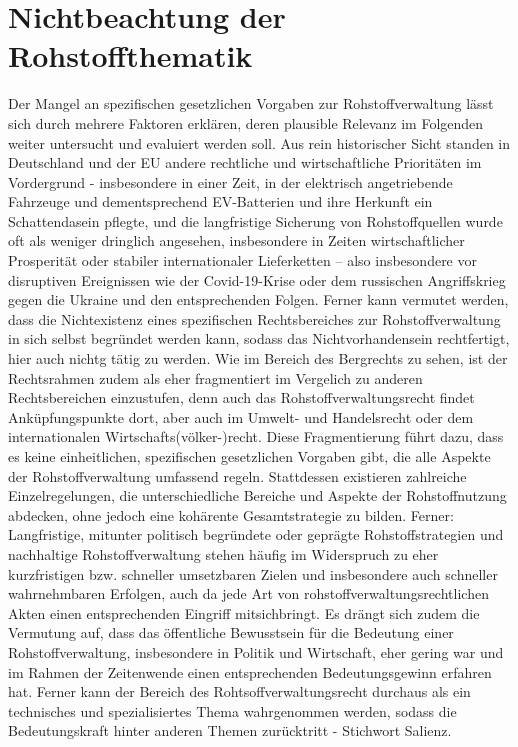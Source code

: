 \documentclass[12pt,a4paper,oneside]{book} %
\begin{document}
{	\section{Nichtbeachtung der Rohstoffthematik}
	Der Mangel an spezifischen gesetzlichen Vorgaben zur Rohstoffverwaltung lässt sich durch mehrere Faktoren erklären, deren plausible Relevanz im Folgenden weiter untersucht und evaluiert werden soll. Aus rein historischer Sicht standen in Deutschland und der EU andere rechtliche und wirtschaftliche Prioritäten im Vordergrund - insbesondere in einer Zeit, in der elektrisch angetriebende Fahrzeuge und dementsprechend EV-Batterien und ihre Herkunft ein Schattendasein pflegte, und die langfristige Sicherung von Rohstoffquellen wurde oft als weniger dringlich angesehen, insbesondere in Zeiten wirtschaftlicher Prosperität oder stabiler internationaler Lieferketten – also insbesondere vor disruptiven Ereignissen wie der Covid-19-Krise oder dem russischen Angriffskrieg gegen die Ukraine und den entsprechenden Folgen.
	Ferner kann vermutet werden, dass die Nichtexistenz eines spezifischen Rechtsbereiches zur Rohstoffverwaltung in sich selbst begründet werden kann, sodass das Nichtvorhandensein rechtfertigt, hier auch nichtg tätig zu werden. Wie im Bereich des Bergrechts zu sehen, ist der Rechtsrahmen zudem als eher fragmentiert im Vergelich zu anderen Rechtsbereichen einzustufen, denn auch das Rohstoffverwaltungsrecht findet Anküpfungspunkte dort, aber auch im Umwelt- und Handelsrecht oder dem internationalen Wirtschafts(völker-)recht. Diese Fragmentierung führt dazu, dass es keine einheitlichen, spezifischen gesetzlichen Vorgaben gibt, die alle Aspekte der Rohstoffverwaltung umfassend regeln. Stattdessen existieren zahlreiche Einzelregelungen, die unterschiedliche Bereiche und Aspekte der Rohstoffnutzung abdecken, ohne jedoch eine kohärente Gesamtstrategie zu bilden.
	Ferner: Langfristige, mitunter politisch begründete oder geprägte Rohstoffstrategien und nachhaltige Rohstoffverwaltung stehen häufig im Widerspruch zu eher kurzfristigen bzw. schneller umsetzbaren Zielen und insbesondere auch schneller wahrnehmbaren Erfolgen, auch da jede Art von rohstoffverwaltungsrechtlichen Akten einen entsprechenden Eingriff mitsichbringt. 
	Es drängt sich zudem die Vermutung auf, dass das öffentliche Bewusstsein für die Bedeutung einer Rohstoffverwaltung, insbesondere in Politik und Wirtschaft, eher gering war und im Rahmen der Zeitenwende einen entsprechenden Bedeutungsgewinn erfahren hat. Ferner kann der Bereich des Rohtsoffverwaltungsrecht durchaus als ein technisches und spezialisiertes Thema wahrgenommen werden, sodass die Bedeutungskraft hinter anderen Themen zurücktritt - Stichwort Salienz.
	
}
\end{document}
